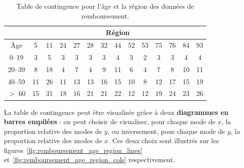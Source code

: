  \begin{table}[h]
    \centering
    \begin{tabular}[h]{|c|c|c|c|c|c|c|c|c|c|c|c|c|c|}
      \hline
      & \multicolumn{13}{|c|}{Région} \\ \hline
      {Âge} & 5 & 11 & 24 & 27 & 28 & 32 & 44 & 52 & 53 & 75 & 76 & 84 & 93 \\ \hline
      0--19 & 3 & 5 & 3 & 3 & 3 & 3 & 4 & 3 & 2 & 3 & 3 & 4 & 4 \\ \hline
      20--39 & 8 & 18 & 4 & 7 & 4 & 9 & 11 & 6 & 4 & 7 & 8 & 10 & 11 \\ \hline
      40--59 & 11 & 26 & 11 & 13 & 13 & 16 & 15 & 10 & 8 & 12 & 17 & 15 & 19 \\ \hline
      $>$ 60 & 15 & 31 & 18 & 16 & 21 & 21 & 22 & 12 & 12 & 19 & 24 & 23 & 26 \\ \hline
    \end{tabular}
    \caption{Table de contingence pour l'âge et la région des données 
      de remboursement.}
    \label{tab:remboursement_age_region}
  \end{table}



La table de contingence peut être visualisée grâce à deux \textbf{diagrammes en
  barres empilées} : on peut choisir de visualiser, pour chaque mode de $x$, la
proportion relative des modes de $y$, ou inversement, pour chaque mode de $y$,
la proportion relative des modes de $x$. Ces deux choix sont illustrés sur les
figures~\ref{fig:remboursement_age_region_lines}
et~\ref{fig:remboursement_age_region_cols} respectivement.

